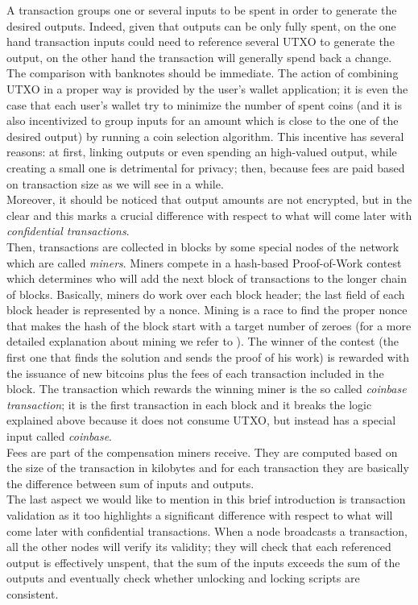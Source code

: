 A transaction groups one or several inputs to be spent in order to generate the desired outputs. Indeed, given that outputs can be only fully spent, on the one hand transaction inputs could need to reference several UTXO to generate the output, on the other hand the transaction will generally spend back a change. The comparison with banknotes should be immediate. The action of combining UTXO in a proper way is provided by the user's wallet application; it is even the case that each user's wallet try to minimize the number of spent coins (and it is also incentivized to group inputs for an amount which is close to the one of the desired output) by running a coin selection algorithm. This incentive has several reasons: at first, linking outputs or even spending an high-valued output, while creating a small one is detrimental for privacy; then, because fees are paid based on transaction size as we will see in a while. \\
Moreover, it should be noticed that output amounts are not encrypted, but in the clear and this marks a crucial difference with respect to what will come later with \textit{confidential transactions}.\\ 
Then, transactions are collected in blocks by some special nodes of the network which are called \textit{miners}. Miners compete in a hash-based Proof-of-Work contest which determines who will add the next block of transactions to the longer chain of blocks. Basically, miners do work over each block header; the last field of each block header is represented by a nonce. Mining is a race to find the proper nonce that makes the hash of the block start with a target number of zeroes (for a more detailed explanation about mining we refer to \cite{MasteringBitcoin}). The winner of the contest (the first one that finds the solution and sends the proof of his work) is rewarded with the issuance of new bitcoins plus the fees of each transaction included in the block. The transaction which rewards the winning miner is the so called \textit{coinbase transaction}; it is the first transaction in each block and it breaks the logic explained above because it does not consume UTXO, but instead has a special input called \textit{coinbase}.\\
Fees are part of the compensation miners receive. They are computed based on the size of the transaction in kilobytes and for each transaction they are basically the difference between sum of inputs and outputs.\\
The last aspect we would like to mention in this brief introduction is transaction validation as it too highlights a significant difference with respect to what will come later with confidential transactions. When a node broadcasts a transaction, all the other nodes will verify its validity; they will check that each referenced output is effectively unspent, that the sum of the inputs exceeds the sum of the outputs and eventually check whether unlocking and locking scripts are consistent.\\

